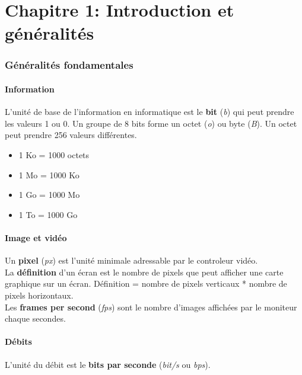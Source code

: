  \part{Chapitre 1: Introduction et généralités}
 \section{Généralités fondamentales}

 \subsection{Information}
 L'unité de base de l'information en informatique est le \textbf{bit} (\textit{b}) qui peut prendre les valeurs 1 ou 0. Un groupe de 8 bits forme un octet (\textit{o}) ou byte (\textit{B}). Un octet peut prendre 256 valeurs différentes.
 \begin{itemize}
 	\item 1 Ko = 1000 octets
 	\item 1 Mo = 1000 Ko
 	\item 1 Go = 1000 Mo
	\item 1 To = 1000 Go
 \end{itemize}

 \subsection{Image et vidéo}
 Un \textbf{pixel} (\textit{px}) est l'unité minimale adressable par le controleur vidéo.\\
 \indent
 La \textbf{définition} d'un écran est le nombre de pixels que peut afficher une carte graphique sur un écran. Définition = nombre de pixels verticaux * nombre de pixels horizontaux.\\
 \indent
 Les \textbf{frames per second} (\textit{fps}) sont le nombre d'images affichées par le moniteur chaque secondes.

 \subsection{Débits}
 L'unité du débit est le \textbf{bits par seconde} (\textit{bit/s} ou \textit{bps}).


